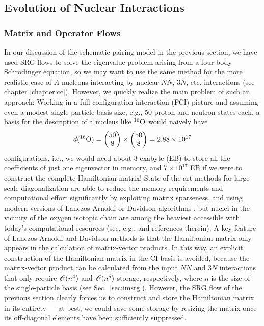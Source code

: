 \subsection{\label{sec:srg_interactions}Evolution of Nuclear Interactions}

%
%
\subsubsection{\label{sec:srg_opflow}Matrix and Operator Flows}
In our discussion of the schematic pairing model in the previous section, we 
have used SRG flows to solve the eigenvalue problem arising from a four-body 
Schr\"odinger equation, so we may want to use the same method for the more 
realistic case of $A$ nucleons interacting by nuclear $NN$, $3N$, etc. 
interactions (see chapter \ref{chapter:cc}). However, we quickly realize the
main problem of such an approach: Working in a full configuration interaction (FCI) 
picture
and assuming even a modest single-particle basis size, e.g., 50 proton and neutron 
states each, a basis for the description of a nucleus like $\nuc{O}{16}$ would 
naively have
\begin{equation}
 d(\nuc{O}{16}) = \begin{pmatrix} 50 \\ 8\end{pmatrix} \times 
           \begin{pmatrix} 50 \\ 8\end{pmatrix}
                = 2.88\times10^{17}
\end{equation}
configurations, i.e., we would need about 3 exabyte (EB) to store all the coefficients
of just one eigenvector in memory, and $7\times10^{17}$ EB if we were to construct
the complete Hamiltonian matrix! State-of-the-art methods for large-scale 
diagonalization are able to reduce the memory requirements and computational
effort significantly by exploiting matrix sparseness, and using modern versions of
Lanczos-Arnoldi \cite{Lanczos:1950sp,Arnoldi:1951kk} or Davidson algorithms 
\cite{Davidson:1989pi}, but nuclei in the vicinity of the oxygen isotopic 
chain are among the heaviest accessible with today's computational
resources (see, e.g., \cite{Yang:2013ly,Barrett:2013oq} and references therein).
A key feature of Lanczos-Arnoldi and Davidson methods is that the
Hamiltonian matrix only appears in the calculation
of matrix-vector products. In this way, an explicit construction of the Hamiltonian
matrix in the CI basis is avoided, because the matrix-vector product can be
calculated from the input $NN$ and $3N$ interactions that only require $\OC(n^4)$ 
and $\OC(n^6)$ storage, respectively, where $n$ is the size of the single-particle
basis (see Sec.~\ref{sec:imsrg}). However, the SRG flow of the previous section 
clearly forces us to construct
and store the Hamiltonian matrix in its entirety --- at best, we could save some
storage by resizing the matrix once its off-diagonal elements have been 
sufficiently suppressed.

